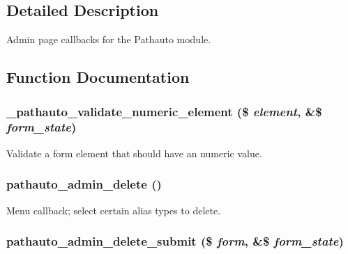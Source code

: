 \subsection{Detailed Description}
Admin page callbacks for the Pathauto module. 

\subsection{Function Documentation}
\hypertarget{pathauto_8admin_8inc_adbd6f0b19fc224aa280c09e13ec53f9d}{
\subsubsection[{\_\-pathauto\_\-validate\_\-numeric\_\-element}]{\setlength{\rightskip}{0pt plus 5cm}\_\-pathauto\_\-validate\_\-numeric\_\-element (\$ {\em element}, \/  \&\$ {\em form\_\-state})}}
\label{pathauto_8admin_8inc_adbd6f0b19fc224aa280c09e13ec53f9d}
Validate a form element that should have an numeric value. \hypertarget{pathauto_8admin_8inc_a5ab614f256c8e356b59a402461ad0d90}{
\subsubsection[{pathauto\_\-admin\_\-delete}]{\setlength{\rightskip}{0pt plus 5cm}pathauto\_\-admin\_\-delete ()}}
\label{pathauto_8admin_8inc_a5ab614f256c8e356b59a402461ad0d90}
Menu callback; select certain alias types to delete. \hypertarget{pathauto_8admin_8inc_a604d88306854d9908e302ead4896f77e}{
\subsubsection[{pathauto\_\-admin\_\-delete\_\-submit}]{\setlength{\rightskip}{0pt plus 5cm}pathauto\_\-admin\_\-delete\_\-submit (\$ {\em form}, \/  \&\$ {\em form\_\-state})}}
